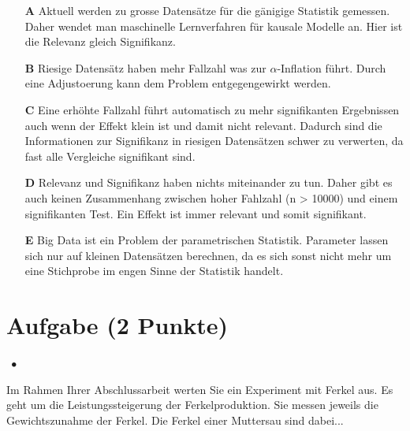 \documentclass[a4paper, 9pt]{scrartcl}\usepackage[]{graphicx}\usepackage[]{xcolor}
\begin{document}
\begin{enumerate}
\item [\textbf{A} \msquare] Aktuell werden zu grosse Datensätze für die gänigige Statistik gemessen. Daher wendet man maschinelle Lernverfahren für kausale Modelle an. Hier ist die Relevanz gleich Signifikanz.
\item [\textbf{B} \msquare] Riesige Datensätz haben mehr Fallzahl was zur $\alpha$-Inflation führt. Durch eine Adjustoerung kann dem Problem entgegengewirkt werden.
\item [\textbf{C} \msquare] Eine erhöhte Fallzahl führt automatisch zu mehr signifikanten Ergebnissen auch wenn der Effekt klein ist und damit nicht relevant. Dadurch sind die Informationen zur Signifikanz in riesigen Datensätzen schwer zu verwerten, da fast alle Vergleiche signifikant sind.
\item [\textbf{D} \msquare] Relevanz und Signifikanz haben nichts miteinander zu tun. Daher gibt es auch keinen Zusammenhang zwischen hoher Fahlzahl (n > 10000) und einem signifikanten Test. Ein Effekt ist immer relevant und somit signifikant.
\item [\textbf{E} \msquare] Big Data ist ein Problem der parametrischen Statistik. Parameter lassen sich nur auf kleinen Datensätzen berechnen, da es sich sonst nicht mehr um eine Stichprobe im engen Sinne der Statistik handelt.
\end{enumerate}

\section{Aufgabe \hfill (2 Punkte)}

\ifcollection
\begin{flushright}
\tiny\vspace{-2Ex}
\textbf{\examinhaltstart}
\exammodulestatversuch $\;\bullet$
\exammodulebiostat
\vspace{-1Ex}
\end{flushright}
\fi




Im Rahmen Ihrer Abschlussarbeit werten Sie ein Experiment mit Ferkel aus. Es geht um die Leistungssteigerung der Ferkelproduktion. Sie messen jeweils die Gewichtszunahme der Ferkel. Die Ferkel einer Muttersau sind dabei...
\end{document}
